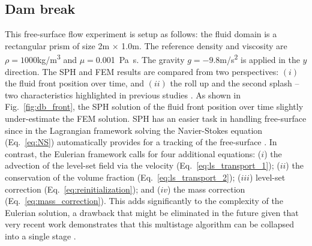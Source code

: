 \documentclass[final,3p,times]{elsarticle}
\begin{document}
\subsection{Dam break}
This free-surface flow experiment is setup as follows: the fluid domain is a rectangular prism of size 2\si{m} $\times$ 1.0\si{m}. The reference density and viscosity are $\rho=1000$\si{kg/m^3} and $\mu=$\SI{0.001}{Pa.s}. The gravity $g=-9.8$\si{m/s^2} is applied in the  $y$ direction. The SPH and FEM results are compared from two perspectives: $(i)$ the fluid front position over time, and $(ii)$ the roll up and the second splash -- two characteristics highlighted in previous studies \cite{colagrossi2003numerical,Adami2012}. As shown in Fig.~\ref{fig:db_front}, the SPH solution of the fluid front position over time slightly under-estimate the FEM solution. SPH has an easier task in handling free-surface since in the Lagrangian framework solving the Navier-Stokes equation (Eq.~\eqref{eq:NS}) automatically provides for a tracking of the free-surface  \cite{Martin1952,colagrossi2003numerical,hughes2010comparison,xu2016improved,miladHalfImplicit2018}. In contrast, the Eulerian framework calls for four additional equations: ($i$) the advection of the level-set field via the velocity (Eq.~\eqref{eq:ls_transport_1}); ($ii$) the conservation of the volume fraction (Eq.~\eqref{eq:ls_transport_2}); ($iii$) level-set correction  (Eq.~\eqref{eq:reinitialization}); and ($iv$) the mass correction (Eq.~\eqref{eq:mass_correction}). This adds significantly to the complexity of the Eulerian solution, a drawback that might be eliminated in the future given that very recent work demonstrates that this multistage algorithm can be collapsed into a single stage \cite{quezadadeluna2019monolithic}. 
\end{document}
